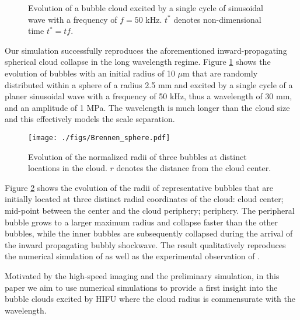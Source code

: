 \documentclass{jfm}
\begin{document}
\begin{figure}
  \center
  \caption{Evolution of a bubble cloud excited by a single cycle of sinusoidal wave with a frequency of $f=50$ kHz. $t^*$ denotes non-dimensional time $t^*=tf$.}
   \label{fig:snap_f50} 
\end{figure}
Our simulation successfully reproduces the aforementioned inward-propagating spherical cloud collapse in the long wavelength regime.
Figure \ref{fig:snap_f50} shows the evolution of bubbles with an initial radius of 10 $\mu$m that are randomly distributed within a sphere of a radius 2.5 mm and excited by a single cycle of a planer sinusoidal wave with a frequency of 50 kHz, thus a wavelength of 30 mm, and an amplitude of 1 MPa.
The wavelength is much longer than the cloud size and this effectively models the scale separation.
\begin{figure}
  \center
  \texttt{[image: ./figs/Brennen\_sphere.pdf]}
  \caption{Evolution of the normalized radii of three bubbles at distinct locations in the cloud. $r$ denotes the distance from the cloud center.}
   \label{fig:Brennenb}
\end{figure}
Figure \ref{fig:Brennenb} shows the evolution of the radii of representative bubbles that are initially located at three distinct radial coordinates of the cloud: cloud center; mid-point between the center and the cloud periphery; periphery.
The peripheral bubble grows to a larger maximum radius and collapse faster than the other bubbles, while the inner bubbles are subsequently collapsed during the arrival of the inward propagating bubbly shockwave.
The result qualitatively reproduces the numerical simulation of \citet{Wang94,Wang99} as well as the experimental observation of \citet{Arora07}.

Motivated by the high-speed imaging and the preliminary simulation, in this paper we aim to use numerical simulations to provide a first insight into the bubble clouds excited by HIFU where the cloud radius is commensurate with the wavelength.
\end{document}
